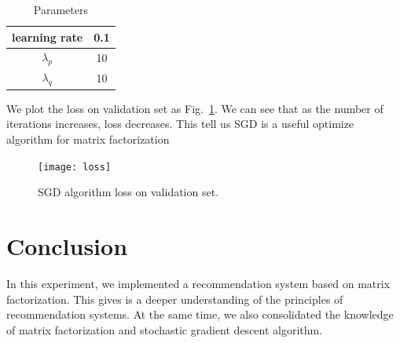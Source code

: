 \documentclass[journal, a4paper]{IEEEtran}
\begin{document}
	\begin{table}[!hbt]
		\begin{center}
		\caption{Parameters}
		\label{tab:parameters}
		\begin{tabular}{|c|c|}
			\hline
			learning rate & 0.1 \\
			\hline
			$\lambda_p$ & 10 \\
            \hline
            $\lambda_q$ & 10 \\
			\hline
		\end{tabular}
		\end{center}
	\end{table}


    We plot the loss on validation set as Fig.~\ref{fig:loss}. We can see that as the number of iterations increases, loss decreases. This tell us SGD is a useful optimize algorithm for matrix factorization

	\begin{figure}[!hbt]
		\begin{center}
		\texttt{[image: loss]}
		\caption{SGD algorithm loss on validation set.}
		\label{fig:loss}
		\end{center}
	\end{figure}


\section{Conclusion}
    In this experiment, we implemented a recommendation system based on matrix factorization. This gives is a deeper understanding of the principles of recommendation systems. At the same time, we also consolidated the knowledge of matrix factorization and stochastic gradient descent algorithm.


\end{document}
